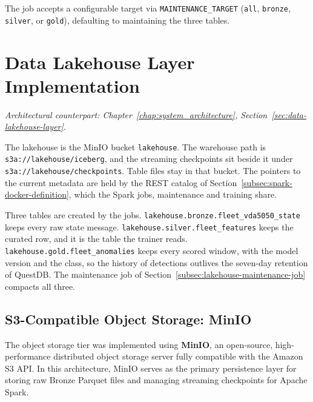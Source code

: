 The job accepts a configurable target via \texttt{MAINTENANCE\_TARGET} (\texttt{all}, \texttt{bronze}, \texttt{silver}, or \texttt{gold}), defaulting to maintaining the three tables.

\section{Data Lakehouse Layer Implementation}
\label{sec:data-lakehouse-implementation}
\textit{Architectural counterpart: Chapter~\ref{chap:system_architecture}, Section~\ref{sec:data-lakehouse-layer}.}

The lakehouse is the MinIO bucket \texttt{lakehouse}. The warehouse path is \texttt{s3a://lakehouse/iceberg}, and the streaming checkpoints sit beside it under \texttt{s3a://lakehouse/checkpoints}. Table files stay in that bucket. The pointers to the current metadata are held by the REST catalog of Section~\ref{subsec:spark-docker-definition}, which the Spark jobs, maintenance and training share.

Three tables are created by the jobs. \texttt{lakehouse.bronze.fleet\_vda5050\_state} keeps every raw state message. \texttt{lakehouse.silver.fleet\_features} keeps the curated row, and it is the table the trainer reads. \texttt{lakehouse.gold.fleet\_anomalies} keeps every scored window, with the model version and the class, so the history of detections outlives the seven-day retention of QuestDB. The maintenance job of Section~\ref{subsec:lakehouse-maintenance-job} compacts all three.

\subsection{S3-Compatible Object Storage: MinIO}
\label{subsec:minio-s3-implementation}

The object storage tier was implemented using \textbf{MinIO}, an open-source, high-performance distributed object storage server fully compatible with the Amazon S3 API. In this architecture, MinIO serves as the primary persistence layer for storing raw Bronze Parquet files and managing streaming checkpoints for Apache Spark.

